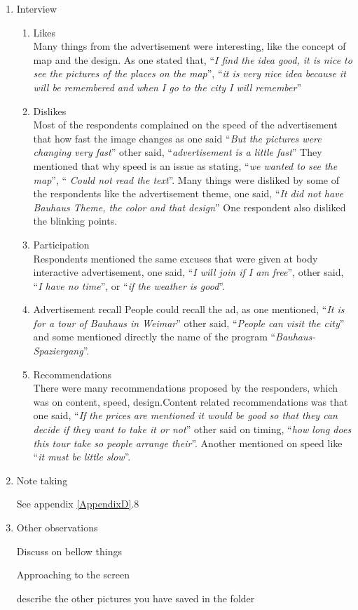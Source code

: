 \begin{enumerate}
\item Interview

\begin{enumerate}

\item Likes \\
Many things from the advertisement were interesting, like the concept of map and the design. As one stated that, ``\emph{I find the idea good, it is nice to see the pictures of the places on the map}'', ``\emph{it is very nice idea because it will be remembered and when I go to the city I will remember}''

\item Dislikes \\
Most of the respondents complained on the speed of the advertisement that how fast the image changes as one said ``\emph{But the pictures were changing very fast}'' other said, ``\emph{advertisement is a little fast}'' They mentioned that why speed is an issue as stating, ``\emph{we wanted to see the map}'', ``\emph{ Could not read the text}''. Many things were disliked by some of the respondents like the advertisement theme, one said, ``\emph{It did not have Bauhaus Theme, the color and that design}'' One respondent also disliked the blinking points.

\item  Participation \\
Respondents mentioned the same excuses that were given at body interactive advertisement, one said, ``\emph{I will join if I am free}'', other said, ``\emph{I have no time}'', or ``\emph{if the weather is good}''. 

\item  Advertisement recall
People could recall the ad, as one mentioned, ``\emph{It is for a tour of Bauhaus in Weimar}'' other said, ``\emph{People can visit the city}'' and some mentioned directly the name of the program ``\emph{Bauhaus-Spaziergang}''.

\item Recommendations \\
There were many recommendations proposed by the responders, which was on content, speed, design.Content related recommendations was that one said, ``\emph{If the prices are mentioned it would be good so that they can decide if they want to take it or not}'' other said on timing, ``\emph{how long does this tour take so people arrange their}''. Another mentioned on speed like ``\emph{it must be little slow}''.

\end{enumerate}


\item Note taking


See appendix  \ref{AppendixD}.8


\item Other observations

Discuss on bellow things

Approaching to the screen

describe the other pictures you have saved in the folder


\end{enumerate}


